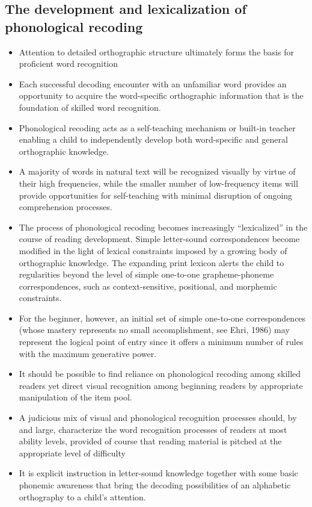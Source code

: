 \documentclass[]{article}
\begin{document}
		\subsection{The development and lexicalization of phonological recoding}	
		\begin{itemize}
			\item Attention to detailed orthographic structure ultimately forms the basis for proficient word recognition
			\item Each successful decoding encounter with an unfamiliar word provides an opportunity to acquire the word-specific orthographic information that is the foundation of skilled word recognition.
			\item Phonological recoding acts as a self-teaching mechanism or built-in teacher enabling a child to independently develop both word-specific and general orthographic knowledge.
			\item A majority of words in natural text will be recognized visually by virtue of their high frequencies, while the smaller number of low-frequency items will provide opportunities for self-teaching with minimal disruption of ongoing comprehension processes.
			\item The process of phonological recoding becomes increasingly ``lexicalized'' in the course of reading development. Simple letter-sound correspondences become modified in the light of lexical constraints imposed by a growing body of orthographic knowledge. The expanding print lexicon alerts the child to regularities beyond the level of simple one-to-one grapheme-phoneme correspondences, such as context-sensitive, positional, and morphemic constraints.
			\item For the beginner, however, an initial set of simple one-to-one correspondences (whose mastery represents no small accomplishment, see Ehri, 1986) may represent the logical point of entry since it offers a minimum number of rules with the maximum generative power.
			\item It should be possible to find reliance on phonological recoding among skilled readers yet direct visual recognition among beginning readers by appropriate manipulation of the item pool.
			\item A judicious mix of visual and phonological recognition processes should, by and large, characterize the word recognition processes of readers at most ability levels, provided of course that reading material is pitched at the appropriate level of difficulty
			\item It is explicit instruction in letter-sound knowledge together with some basic phonemic awareness that bring the decoding possibilities of an alphabetic orthography to a child's attention.

\end{itemize}
\end{document}
